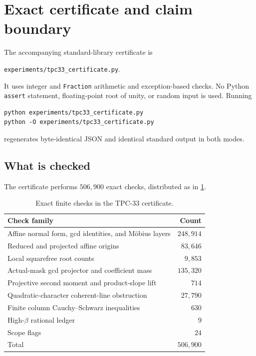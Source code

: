 \section{Exact certificate and claim boundary}
\label{sec:tpc33-certificate-scope}

The accompanying standard-library certificate is
\begin{center}
 \texttt{experiments/tpc33\_certificate.py}.
\end{center}
It uses integer and \texttt{Fraction} arithmetic and exception-based
checks.  No Python \texttt{assert} statement, floating-point root of unity,
or random input is used.  Running
\begin{verbatim}
python experiments/tpc33_certificate.py
python -O experiments/tpc33_certificate.py
\end{verbatim}
regenerates byte-identical JSON and identical standard output in both
modes.

\subsection{What is checked}

The certificate performs \(506{,}900\) exact checks, distributed as in
\cref{tab:tpc33-certificate-counts}.

\begin{table}[H]
\centering
\caption{Exact finite checks in the TPC-33 certificate.}
\label{tab:tpc33-certificate-counts}
\begin{tabular}{@{}lr@{}}
\toprule
Check family & Count \\
\midrule
Affine normal form, gcd identities, and M\"obius layers & \(248{,}914\) \\
Reduced and projected affine origins & \(83{,}646\) \\
Local squarefree root counts & \(9{,}853\) \\
Actual-mask gcd projector and coefficient mass & \(135{,}320\) \\
Projective second moment and product-slope lift & \(714\) \\
Quadratic-character coherent-line obstruction & \(27{,}790\) \\
Finite column Cauchy--Schwarz inequalities & \(630\) \\
High-\(\beta\) rational ledger & \(9\) \\
Scope flags & \(24\) \\
\midrule
Total & \(506{,}900\) \\
\bottomrule
\end{tabular}
\end{table}

